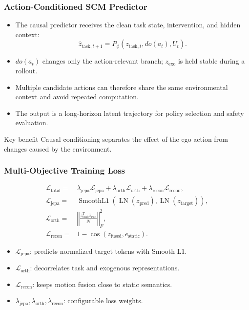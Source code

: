 \begin{frame}
  \frametitle{Action-Conditioned SCM Predictor}
  \begin{itemize}
    \item The causal predictor receives the clean task state, intervention, and hidden context:
      \[
        \hat{z}_{\text{task},t+1} = P_\phi\left(z_{\text{task},t},do(a_t),U_t\right).
      \]
    \item $do(a_t)$ changes only the action-relevant branch; $z_{\text{exo}}$ is held stable during a rollout.
    \item Multiple candidate actions can therefore share the same environmental context and avoid repeated computation.
    \item The output is a long-horizon latent trajectory for policy selection and safety evaluation.
  \end{itemize}
  \vspace{0.3em}
  \begin{block}{Key benefit}
    Causal conditioning separates the effect of the ego action from changes caused by the environment.
  \end{block}
\end{frame}

\begin{frame}
  \frametitle{Multi-Objective Training Loss}
  \begin{align*}
    \mathcal{L}_{\mathrm{total}} ={}& \lambda_{\mathrm{jepa}}\mathcal{L}_{\mathrm{jepa}}
      + \lambda_{\mathrm{orth}}\mathcal{L}_{\mathrm{orth}}
      + \lambda_{\mathrm{recon}}\mathcal{L}_{\mathrm{recon}},\\
    \mathcal{L}_{\mathrm{jepa}} ={}& \operatorname{SmoothL1}
      \!\left(\operatorname{LN}(z_{\mathrm{pred}}),\operatorname{LN}(z_{\mathrm{target}})\right),\\
    \mathcal{L}_{\mathrm{orth}} ={}& \left\Vert
      \frac{\bar z_{\mathrm{task}}^{T}\bar z_{\mathrm{exo}}}{N}
      \right\Vert_F^2,\\
    \mathcal{L}_{\mathrm{recon}} ={}& 1-\cos\!\left(z_{\mathrm{fused}},e_{\mathrm{static}}\right).
  \end{align*}
  \begin{itemize}
    \item $\mathcal{L}_{\mathrm{jepa}}$: predicts normalized target tokens with Smooth L1.
    \item $\mathcal{L}_{\mathrm{orth}}$: decorrelates task and exogenous representations.
    \item $\mathcal{L}_{\mathrm{recon}}$: keeps motion fusion close to static semantics.
    \item $\lambda_{\mathrm{jepa}},\lambda_{\mathrm{orth}},\lambda_{\mathrm{recon}}$: configurable loss weights.
  \end{itemize}
\end{frame}

